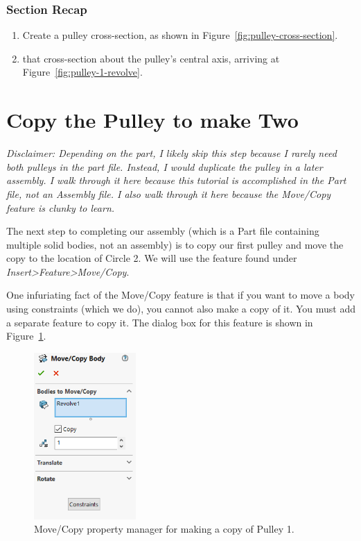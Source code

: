 \subsubsection{Section Recap}

\begin{enumerate}
\item{} Create a pulley cross-section, as shown in Figure~\ref{fig:pulley-cross-section}.
\item{}  that cross-section about the pulley's central axis, arriving at
Figure~\ref{fig:pulley-1-revolve}.
\end{enumerate}

\section{Copy the Pulley to make Two}

\label{sec:copy_the_pulley}

\emph{Disclaimer: Depending on the part, I likely skip this step because I rarely
need both pulleys in the part file. Instead, I would duplicate the pulley in a
later assembly. I walk through it here because this tutorial is
accomplished in the Part file, not an Assembly file. I also walk through it here
because the Move/Copy feature is clunky to learn.}

\hfill\break

The next step to completing our assembly (which is a Part file containing
multiple solid bodies, not an assembly) is to copy our first pulley and move the copy to the
location of Circle 2. We will use the  feature found under
\emph{Insert\textgreater{}Feature\textgreater{}Move/Copy}.

One infuriating fact of the Move/Copy feature is that if
you want to move a body using constraints (which we do), you cannot also make a
copy of it. You must add a separate feature to copy it. The dialog box for this
feature is shown in Figure~\ref{fig:copy-pulley-1}.

\begin{figure}[H]
\begin{center}
  \includegraphics[height=2.5in]{images/figures/copy-pulley-1.png}
\end{center}
\caption{Move/Copy property manager for making a copy of Pulley 1.
\label{fig:copy-pulley-1}}

\end{figure}


